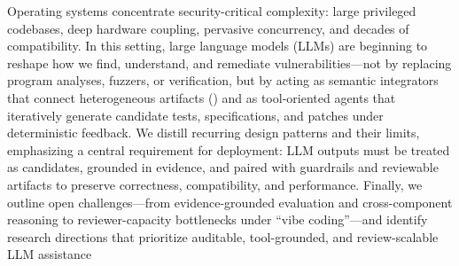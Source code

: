 Operating systems concentrate security-critical complexity: large privileged codebases, 
deep hardware coupling, pervasive concurrency, and decades of compatibility. 
In this setting, large language models (LLMs) are beginning to reshape how we find, 
understand, and remediate vulnerabilities---not by replacing program analyses, fuzzers, or verification, 
but by acting as semantic integrators that connect heterogeneous artifacts
 () and as tool-oriented agents
  that iteratively generate candidate tests, specifications, and patches under deterministic feedback.
 We distill recurring design patterns and their limits, emphasizing a central requirement for deployment: LLM outputs must be treated as candidates, grounded in  evidence, and paired with guardrails and reviewable artifacts to preserve correctness, compatibility, and performance. Finally, we outline open challenges---from evidence-grounded evaluation and cross-component reasoning to reviewer-capacity bottlenecks under ``vibe coding''---and identify research directions that prioritize auditable, tool-grounded, and review-scalable LLM assistance 


